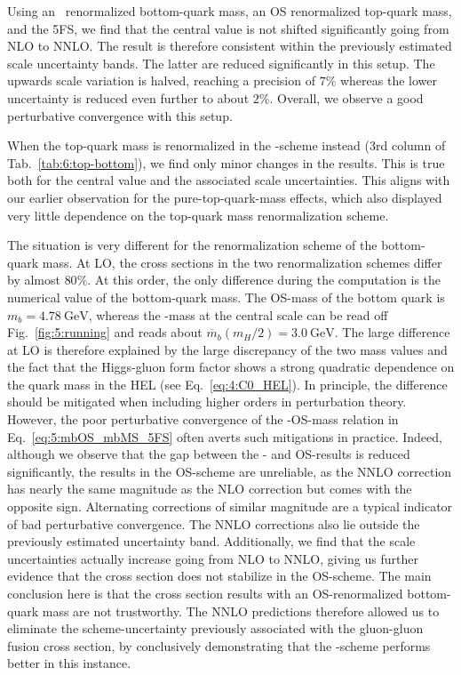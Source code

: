 Using an \MS\ renormalized bottom-quark mass, an \acs{OS} renormalized top-quark mass, and the 5\acs{FS}, we find that the central value is not shifted significantly going from \acs{NLO} to \acs{NNLO}. The result is therefore consistent within the previously estimated scale uncertainty bands. The latter are reduced significantly in this setup. The upwards scale variation is halved, reaching a precision of $7\%$ whereas the lower uncertainty is reduced even further to about $2\%$. Overall, we observe a good perturbative convergence with this setup.

When the top-quark mass is renormalized in the \MS-scheme instead (3rd column of Tab.~\ref{tab:6:top-bottom}), we find only minor changes in the results. This is true both for the central value and the associated scale uncertainties. This aligns with our earlier observation for the pure-top-quark-mass effects, which also displayed very little dependence on the top-quark mass renormalization scheme.

The situation is very different for the renormalization scheme of the bottom-quark mass. At \acs{LO}, the cross sections in the two renormalization schemes differ by almost $80\%$. At this order, the only difference during the computation is the numerical value of the bottom-quark mass. The \acs{OS}-mass of the bottom quark is $m_b = 4.78\ \text{GeV}$, whereas the \MS-mass at the central scale can be read off Fig.~\ref{fig:5:running} and reads about $\overline{m}_b(m_H/2) = 3.0\ \text{GeV}$. The large difference at \acs{LO} is therefore explained by the large discrepancy of the two mass values and the fact that the Higgs-gluon form factor shows a strong quadratic dependence on the quark mass in the \acs{HEL} (see Eq.~\eqref{eq:4:C0_HEL}). In principle, the difference should be mitigated when including higher orders in perturbation theory. However, the poor perturbative convergence of the \MS-\acs{OS}-mass relation in Eq.~\eqref{eq:5:mbOS_mbMS_5FS} often averts such mitigations in practice. Indeed, although we observe that the gap between the \MS- and \acs{OS}-results is reduced significantly, the results in the \acs{OS}-scheme are unreliable, as the \acs{NNLO} correction has nearly the same magnitude as the \acs{NLO} correction but comes with the opposite sign. Alternating corrections of similar magnitude are a typical indicator of bad perturbative convergence. The \acs{NNLO} corrections also lie outside the previously estimated uncertainty band. Additionally, we find that the scale uncertainties actually increase going from \acs{NLO} to \acs{NNLO}, giving us further evidence that the cross section does not stabilize in the \acs{OS}-scheme. The main conclusion here is that the cross section results with an \acs{OS}-renormalized bottom-quark mass are not trustworthy. The \acs{NNLO} predictions therefore allowed us to eliminate the scheme-uncertainty previously associated with the gluon-gluon fusion cross section, by conclusively demonstrating that the \MS-scheme performs better in this instance.

